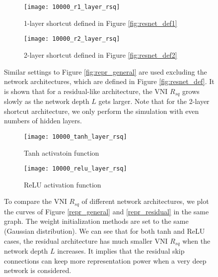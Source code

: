 \begin{figure}[h]
    \centering
    \newcommand{\myWidth}{0.9\textwidth}
    \begin{subfigure}{\myWidth}
      \centering
      \caption{1-layer shortcut defined in Figure \ref{fig:resnet_def1}}
      \texttt{[image: 10000\_r1\_layer\_rsq]}
      \label{fig:repr_residual_a}
    \end{subfigure}
    
    \begin{subfigure}{\myWidth}
      \centering
      \caption{2-layer shortcut defined in Figure \ref{fig:resnet_def2}}
      \texttt{[image: 10000\_r2\_layer\_rsq]}
      \label{fig:repr_residual_b}
    \end{subfigure}%
    \caption[The initial VNI $R_{sq}$ of residual networks.]{
    Similar settings to Figure \ref{fig:repr_general} are used excluding the network architectures,
    which are defined in Figure \ref{fig:resnet_def}.
    It is shown that for a residual-like architecture, the VNI $R_{sq}$ grows slowly as the network
    depth $L$ gets larger.
    Note that for the 2-layer shortcut architecture, we only perform the simulation with even numbers
    of hidden layers.}
    \label{fig:repr_residual}
\end{figure}


\begin{figure}[h]
    \centering
    \newcommand{\myWidth}{0.9\textwidth}
    \begin{subfigure}{\myWidth}
      \centering
      \caption{Tanh activatoin function}
      \texttt{[image: 10000\_tanh\_layer\_rsq]}
      \label{fig:repr_architecture_a}
    \end{subfigure}
    
    \begin{subfigure}{\myWidth}
      \centering
      \caption{ReLU activation function}
      \texttt{[image: 10000\_relu\_layer\_rsq]}
      \label{fig:repr_architecture_b}
    \end{subfigure}%
    \caption[The initial VNI $R_{sq}$ of different network architectures.]{
    To compare the VNI $R_{sq}$ of different network architectures, we plot the curves of Figure
    \ref{repr_general} and \ref{repr_residual} in the same graph.
    The weight initialization methods are set to the same (Gaussian distribution).
    We can see that for both tanh and ReLU cases, the residual architecture has much smaller VNI
    $R_{sq}$ when the network depth $L$ increases.
    It implies that the residual skip connections can keep more representation power when a very deep
    network is considered.
    }
    \label{fig:repr_architecture}
\end{figure}

